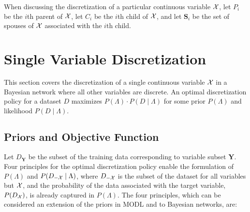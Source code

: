 When discussing the discretization of a particular continuous variable $\mathcal{X}$, let $P_i$ be the $i$th parent of $\mathcal{X}$, let $C_i$ be the $i$th child of $\mathcal{X}$, and let $\bm{S}_i$ be the set of spouses of $\mathcal{X}$ associated with the $i$th child.


\section{Single Variable Discretization}
\label{sec:single_var}

This section covers the discretization of a single continuous variable $\mathcal{X}$ in a Bayesian network where all other variables are discrete.
An optimal discretization policy for a dataset $D$ maximizes $P(\Lambda)\cdot P(D\mid \Lambda)$ for some prior $P(\Lambda)$ and likelihood $P(D\mid \Lambda)$.





\subsection{Priors and Objective Function}

Let $D_{\bm{Y}}$ be the subset of the training data corresponding to variable subset $\bm{Y}$.
Four principles for the optimal discretization policy enable the formulation of $P(\Lambda)$ and $P(D_{-\mathcal{X}} \mid \Lambda)$, where $D_{-\mathcal{X}}$ is the subset of the dataset for all variables but $\mathcal{X}$, and the probability of the data associated with the target variable, $P(D_{\mathcal{X}})$, is already captured in $P(\Lambda)$.
The four principles, which can be considered an extension of the priors in MODL and \cite{Lustgarten_2011} to Bayesian networks, are:

